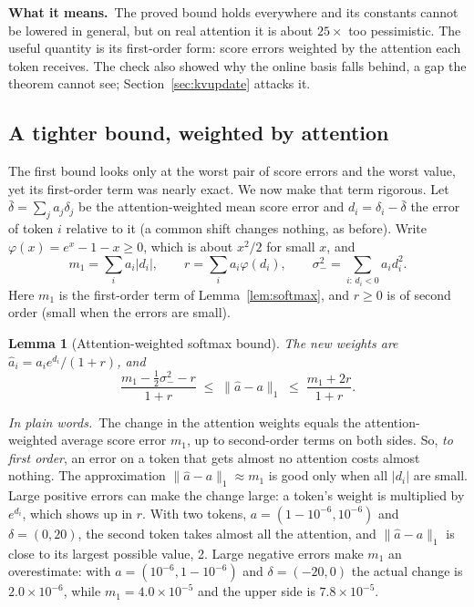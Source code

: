 \documentclass[10pt]{article}
\theoremstyle{plain}
\newtheorem{lemma}[theorem]{Lemma}
\theoremstyle{definition}
\theoremstyle{remark}
\newcommand{\plain}{\noindent\emph{In plain words.}\ }
\newcommand{\means}{\noindent\textbf{What it means.}\ }
\begin{document}
\means The proved bound holds everywhere and its constants cannot be lowered in general, but on real attention it is about $25\times$ too pessimistic. The useful quantity is its first-order form: score errors weighted by the attention each token receives. The check also showed why the online basis falls behind, a gap the theorem cannot see; Section~\ref{sec:kvupdate} attacks it.

\subsection{A tighter bound, weighted by attention}
\label{sec:bound2}

The first bound looks only at the worst pair of score errors and the worst value, yet its first-order term was nearly exact. We now make that term rigorous. Let $\bar\delta=\sum_ja_j\delta_j$ be the attention-weighted mean score error and $d_i=\delta_i-\bar\delta$ the error of token $i$ relative to it (a common shift changes nothing, as before). Write $\varphi(x)=e^x-1-x\ge0$, which is about $x^2/2$ for small $x$, and
\[
m_1=\sum_ia_i\lvert d_i\rvert,\qquad r=\sum_ia_i\varphi(d_i),\qquad \sigma_-^2=\sum_{i:\,d_i<0}a_id_i^2 .
\]
Here $m_1$ is the first-order term of Lemma~\ref{lem:softmax}, and $r\ge0$ is of second order (small when the errors are small).

\begin{lemma}[Attention-weighted softmax bound]\label{lem:softmax2}
The new weights are $\hat a_i=a_ie^{d_i}/(1+r)$, and
\[
\frac{m_1-\tfrac12\sigma_-^2-r}{1+r}\;\le\;\lVert\hat a-a\rVert_1\;\le\;\frac{m_1+2r}{1+r}.
\]
\end{lemma}

\plain The change in the attention weights equals the attention-weighted average score error $m_1$, up to second-order terms on both sides. So, \emph{to first order}, an error on a token that gets almost no attention costs almost nothing. The approximation $\lVert\hat a-a\rVert_1\approx m_1$ is good only when all $\lvert d_i\rvert$ are small. Large positive errors can make the change large: a token's weight is multiplied by $e^{d_i}$, which shows up in $r$. With two tokens, $a=(1-10^{-6},10^{-6})$ and $\delta=(0,20)$, the second token takes almost all the attention, and $\lVert\hat a-a\rVert_1$ is close to its largest possible value, 2. Large negative errors make $m_1$ an overestimate: with $a=(10^{-6},1-10^{-6})$ and $\delta=(-20,0)$ the actual change is $2.0\times10^{-6}$, while $m_1=4.0\times10^{-5}$ and the upper side is $7.8\times10^{-5}$.
\end{document}

